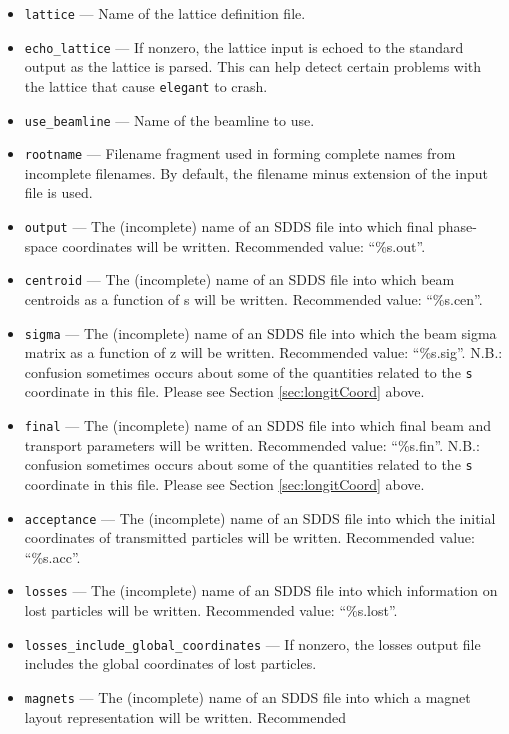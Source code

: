 \documentclass[11pt]{article}
\begin{document}
\begin{itemize}
\item \verb|lattice| --- Name of the lattice definition file.
\item \verb|echo_lattice| --- If nonzero, the lattice input is echoed to the
        standard output as the lattice is parsed.  This can help detect certain
        problems with the lattice that cause \verb|elegant| to crash.
\item \verb|use_beamline| --- Name of the beamline to use.
\item \verb|rootname| --- Filename fragment used in forming complete names from incomplete filenames.  By default, 
the filename minus extension of the input file is used.
\item \verb|output| --- The (incomplete) name of an SDDS file into which final phase-space coordinates
will be written.  Recommended value: ``\%s.out''.
\item \verb|centroid| --- The (incomplete) name of an SDDS file into which beam centroids as a function
of s will be written.   Recommended value: ``\%s.cen''.
\item \verb|sigma| --- The (incomplete) name of an SDDS file into
which the beam sigma matrix as a function of z will be written.
Recommended value: ``\%s.sig''.  N.B.: confusion sometimes occurs about some of the quantities related to
the {\tt s} coordinate in this file.  Please see Section \ref{sec:longitCoord} above.
\item \verb|final| --- The (incomplete) name of an SDDS file into
which final beam and transport parameters will be written. Recommended
value: ``\%s.fin''.   N.B.: confusion sometimes occurs about some of the quantities related to
the {\tt s} coordinate in this file.  Please see Section \ref{sec:longitCoord} above.
\item \verb|acceptance| --- The (incomplete) name of an SDDS file into
which the initial coordinates of transmitted particles will be
written.  Recommended value: ``\%s.acc''.
\item \verb|losses| --- The (incomplete) name of an SDDS file into
which information on lost particles will be written. Recommended
value: ``\%s.lost''.
\item \verb|losses_include_global_coordinates| --- If nonzero, the losses output file includes the
  global coordinates of lost particles.
\item \verb|magnets| --- The (incomplete) name of an SDDS file into
which a magnet layout representation will be written.  Recommended

\end{itemize}
\end{document}
